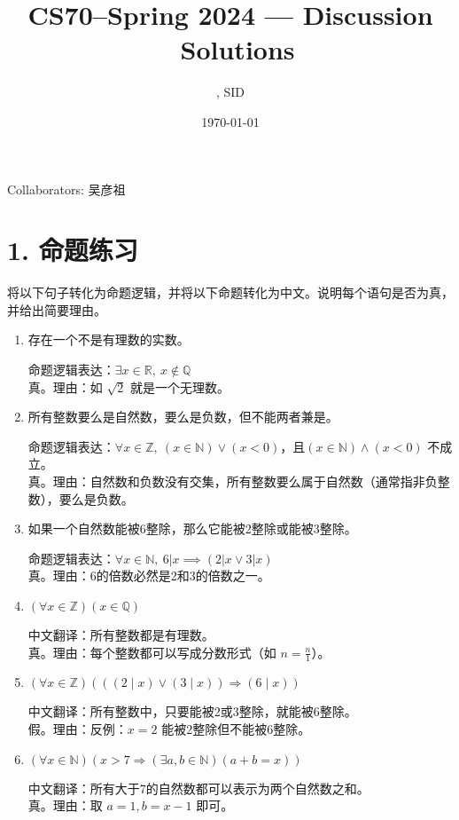 \documentclass[11pt]{article}
\title{CS70--Spring 2024 --- Discussion \Homework \  Solutions}
\author{\Name, SID \SID}
\date{\today}
\newenvironment{qparts}{\begin{enumerate}[{(}a{)}]}{\end{enumerate}}
\begin{document}
\maketitle

Collaborators: 吴彦祖

\section*{1. 命题练习}
将以下句子转化为命题逻辑，并将以下命题转化为中文。说明每个语句是否为真，并给出简要理由。

\begin{qparts}
\item 存在一个不是有理数的实数。

命题逻辑表达：$\exists x \in \mathbb{R},\ x \notin \mathbb{Q}$\\
真。理由：如 $\sqrt{2}$ 就是一个无理数。

\item 所有整数要么是自然数，要么是负数，但不能两者兼是。

命题逻辑表达：$\forall x \in \mathbb{Z},\ (x \in \mathbb{N}) \vee (x < 0)$，且$(x \in \mathbb{N}) \wedge (x < 0)$ 不成立。\\
真。理由：自然数和负数没有交集，所有整数要么属于自然数（通常指非负整数），要么是负数。

\item 如果一个自然数能被6整除，那么它能被2整除或能被3整除。

命题逻辑表达：$\forall x \in \mathbb{N},\ 6|x \implies (2|x \vee 3|x)$\\
真。理由：6的倍数必然是2和3的倍数之一。

\item $(\forall x \in \mathbb{Z})(x \in \mathbb{Q})$

中文翻译：所有整数都是有理数。\\
真。理由：每个整数都可以写成分数形式（如 $n = \frac{n}{1}$）。

\item $(\forall x \in \mathbb{Z})(((2 \mid x) \vee (3 \mid x)) \Longrightarrow (6 \mid x))$

中文翻译：所有整数中，只要能被2或3整除，就能被6整除。\\
假。理由：反例：$x=2$ 能被2整除但不能被6整除。

\item $(\forall x \in \mathbb{N})(x > 7 \Longrightarrow (\exists a, b \in \mathbb{N})(a + b = x))$

中文翻译：所有大于7的自然数都可以表示为两个自然数之和。\\
真。理由：取 $a=1, b=x-1$ 即可。

\end{qparts}
\end{document}
